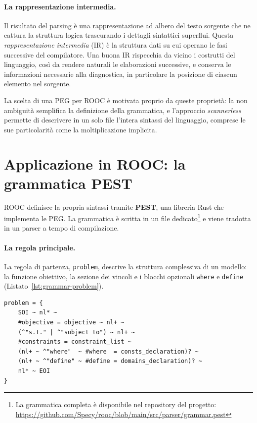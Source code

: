 \paragraph{La rappresentazione intermedia.}
Il risultato del parsing è una rappresentazione ad
albero del testo sorgente che ne cattura la struttura logica trascurando i dettagli sintattici
superflui. Questa \emph{rappresentazione intermedia} (IR) è la struttura dati su
cui operano le fasi successive del compilatore. Una buona IR rispecchia da
vicino i costrutti del linguaggio, così da rendere naturali le elaborazioni
successive, e conserva le informazioni necessarie alla diagnostica, in
particolare la posizione di ciascun elemento nel sorgente.

La scelta di una PEG per ROOC è motivata proprio da queste proprietà: la non
ambiguità semplifica la definizione della grammatica, e l'approccio
\emph{scannerless} permette di descrivere in un solo file l'intera sintassi del
linguaggio, comprese le sue particolarità come la moltiplicazione implicita.

\section{Applicazione in ROOC: la grammatica PEST}
\label{sec:grammatica-pest}

ROOC definisce la propria sintassi tramite \textbf{PEST}, una libreria Rust che
implementa le PEG. La grammatica è scritta in un file dedicato\footnote{La
grammatica completa è disponibile nel repository del progetto:
\url{https://github.com/Specy/rooc/blob/main/src/parser/grammar.pest}} e viene
tradotta in un parser a tempo di compilazione.

\paragraph{La regola principale.}
La regola di partenza, \texttt{problem}, descrive la struttura complessiva di un
modello: la funzione obiettivo, la sezione dei vincoli e i blocchi opzionali
\texttt{where} e \texttt{define} (Listato~\ref{lst:grammar-problem}).

\begin{lstlisting}[language=pest, caption={La regola principale della grammatica.}, label={lst:grammar-problem}]
problem = {
    SOI ~ nl* ~
    #objective = objective ~ nl+ ~
    (^"s.t." | ^"subject to") ~ nl+ ~
    #constraints = constraint_list ~
    (nl+ ~ ^"where"  ~ #where  = consts_declaration)? ~
    (nl+ ~ ^"define" ~ #define = domains_declaration)? ~
    nl* ~ EOI
}
\end{lstlisting}


